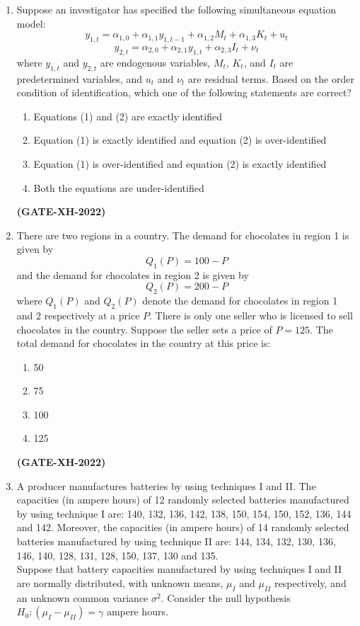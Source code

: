\documentclass[journal]{IEEEtran}
\begin{document}
\begin{enumerate}
\item Suppose an investigator has specified the following simultaneous equation model:
\[
y_{1,t} = \alpha_{1,0} + \alpha_{1,1} y_{1,t-1} + \alpha_{1,2} M_t + \alpha_{1,3} K_t + u_t \tag{1}
\]
\[
y_{2,t} = \alpha_{2,0} + \alpha_{2,1} y_{1,t} + \alpha_{2,3} I_t + \nu_t \tag{2}
\]
where $y_{1,t}$ and $y_{2,t}$ are endogenous variables, $M_t$, $K_t$, and $I_t$ are predetermined variables, and $u_t$ and $\nu_t$ are residual terms. Based on the order condition of identification, which one of the following statements are correct?
\begin{enumerate}
\item Equations (1) and (2) are exactly identified
\item Equation (1) is exactly identified and equation (2) is over-identified
\item Equation (1) is over-identified and equation (2) is exactly identified
\item Both the equations are under-identified
\end{enumerate}
\hfill\textbf{(GATE-XH-2022)}

\item There are two regions in a country. The demand for chocolates in region 1 is given by
\[
Q_1(P) = 100 - P
\]
and the demand for chocolates in region 2 is given by
\[
Q_2(P) = 200 - P
\]
where $Q_1(P)$ and $Q_2(P)$ denote the demand for chocolates in region 1 and 2 respectively at a price $P$. There is only one seller who is licensed to sell chocolates in the country. Suppose the seller sets a price of $P = 125$. The total demand for chocolates in the country at this price is:
\begin{multicols}{4}
\begin{enumerate}
\item 50
\item 75
\item 100
\item 125
\end{enumerate}
\end{multicols}
\hfill\textbf{(GATE-XH-2022)}

\item A producer manufactures batteries by using techniques I and II. The capacities (in ampere hours) of 12 randomly selected batteries manufactured by using technique I are: 140, 132, 136, 142, 138, 150, 154, 150, 152, 136, 144 and 142. Moreover, the capacities (in ampere hours) of 14 randomly selected batteries manufactured by using technique II are: 144, 134, 132, 130, 136, 146, 140, 128, 131, 128, 150, 137, 130 and 135.\\
Suppose that battery capacities manufactured by using techniques I and II are normally distributed, with unknown means, $\mu_I$ and $\mu_{II}$ respectively, and an unknown common variance $\sigma^2$. Consider the null hypothesis $H_0: (\mu_I - \mu_{II}) = \gamma$ ampere hours.  


\end{enumerate}
\end{document}
